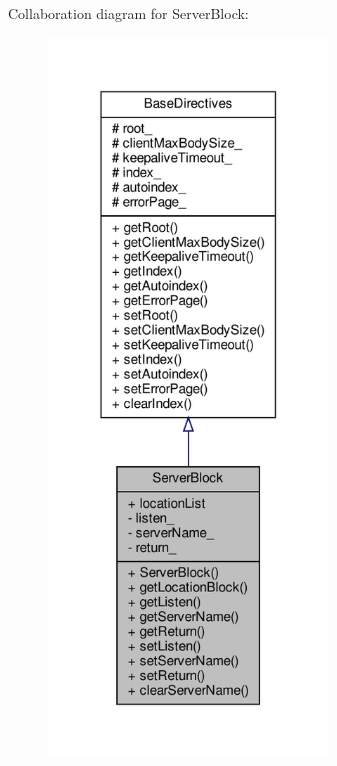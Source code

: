 Collaboration diagram for Server\+Block\+:
\nopagebreak
\begin{figure}[H]
\begin{center}
\leavevmode
\includegraphics[width=211pt]{classft_1_1_server_block__coll__graph}
\end{center}
\end{figure}
